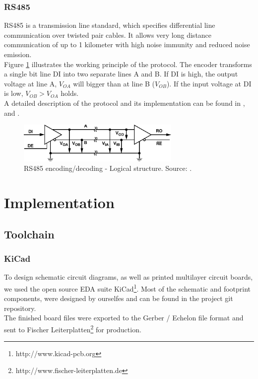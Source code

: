 \documentclass[a4paper]{scrreprt}
\begin{document}
\subsection{RS485}
RS485 is a transmission line standard, which specifies differential line communication over twisted pair cables. It allows very long distance communication of up to 1 kilometer with high noise immunity and reduced noise emission.\\
Figure \ref{fig:rs485} illustrates the working principle of the protocol. The encoder transforms a single bit line DI into two separate lines A and B. If DI is high, the output voltage at line A, $V_{OA}$ will bigger than at line B ($V_{OB}$). If the input voltage at DI is low, $V_{OB}>V_{OA}$ holds.\\
A detailed description of the protocol and its implementation can be found in \cite{rs485}, \cite{st485} and \cite{st485appnote}.
\begin{figure}[b]
	\centering
	\includegraphics[width=0.7\textwidth]{img/rs485.pdf}
  \caption{RS485 encoding/decoding - Logical structure. Source: \cite{rs485}.}
	\label{fig:rs485}
\end{figure}

\chapter{Implementation}
\section{Toolchain}
\subsection{KiCad}
To design schematic circuit diagrams, as well as printed multilayer circuit boards, we used the open source EDA suite KiCad\footnote{http://www.kicad-pcb.org}. Most of the schematic and footprint components, were designed by ourselfes and can be found in the project git repository.\\
The finished board files were exported to the Gerber / Echelon file format and sent to Fischer Leiterplatten\footnote{http://www.fischer-leiterplatten.de} for production.
\end{document}
